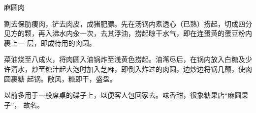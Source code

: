 %
%
%
%
%
%
%
\begin{recipe}{麻圆肉}

\ingredients


\preparation

\step 割去保肋痩肉，铲去肉皮，成猪肥膘。先在汤锅内煮透心（已熟）捞起，切成四分
见方的颗，再入沸水内汆一次，去其浮油，捞起晾干水气，即在连蛋黄的蛋豆粉内裹上一
层，即成待用的肉圆。

\step 菜油烧至八成火，将肉圆入油锅炸至浅黄色捞起。油滗尽后，在锅内放入白糖及少
许清水，炒至糖汁起大泡时加入芝麻，即倒入炸过的肉圆，边炒边将锅几颠，使肉圆裹糖
起锅。敞风，糖即干，盛盘。

\features

以前多用于一般席桌的碟子上，以便客人包回家去。味香甜，很象糖果店“麻圆果子”，
故名。

\end{recipe}

